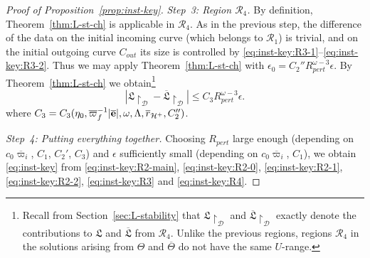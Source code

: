 \documentclass[10pt, reqno]{amsart}
\theoremstyle{definition}
\theoremstyle{remark}
\theoremstyle{conjecture}
\numberwithin{equation}{section}
\newcommand{\abs}[1]{\vert#1\vert}
\newcommand{\0}{\emptyset}
\newcommand{\eps}{\epsilon}
\newcommand{\Lmb}{\Lambda}
\newcommand{\Tht}{\Theta}
\newcommand{\omg}{\omega}
\newcommand{\bfe}{{\bf e}}
\newcommand{\calD}{\mathcal D}
\newcommand{\calH}{\mathcal H}
\newcommand{\calR}{\mathcal R}
\newcommand{\EH}{\calH^{+}}
\newcommand{\pfstep}[1]{\vspace{.5em} {\it \noindent #1.}}
\newcommand{\e}{\bfe}							%
\newcommand{\rbg}{\overline{r}}					%
\newcommand{\varpibg}{\overline{\varpi}}				%
\newcommand{\ebg}{\overline{\e}}					%
\newcommand{\Abs}[1]{\left\vert #1 \right\vert}
\begin{document}
\begin{proof}[Proof of Proposition~\ref{prop:inst-key}]
\pfstep{Step~3: Region $\calR_{4}$}
By definition, Theorem~\ref{thm:L-st-ch} is applicable in $\calR_{4}$. As in the previous step, the difference of the data on the initial incoming curve (which belongs to $\calR_{1}$) is trivial, and on the initial outgoing curve $C_{out}$
its size is controlled by \eqref{eq:inst-key:R3-1}--\eqref{eq:inst-key:R3-2}. Thus we may apply Theorem~\ref{thm:L-st-ch} with $\eps_{0}=C_{2}'' R_{pert}^{\omg-3}  \eps$. By Theorem~\ref{thm:L-st-ch} we obtain\footnote{Recall from Section~\ref{sec:L-stability} that $\mathfrak{L} \restriction_{\calD}$ and $\overline{\mathfrak{L}}\restriction_{\calD}$ exactly denote the contributions to $\mathfrak{L}$ and $\overline{\mathfrak{L}}$ from $\calR_{4}$. Unlike the previous regions, regions $\calR_{4}$ in the solutions arising from $\Tht$ and $\overline{\Tht}$ do not have the same $U$-range.}
\begin{equation} \label{eq:inst-key:R4}
\Abs{\mathfrak{L} \restriction_{\calD}- \overline{\mathfrak{L}}\restriction_{\calD}}
\leq C_{3} R_{pert}^{\omg-3} \eps.
\end{equation}
where $C_{3} = C_{3}(\eta_{0}, \varpibg_{f}^{-1} \abs{\ebg}, \omg, \Lmb, \rbg_{\EH}, C_{2}'')$. 

\pfstep{Step~4: Putting everything together} Choosing $R_{pert}$ large enough (depending on $c_0 \varpibg_{i}$, $C_{1}$, $C_{2}'$, $C_{3}$) and $\eps$ sufficiently small (depending on $c_0 \varpibg_{i}$, $C_{1}$), we obtain \eqref{eq:inst-key} from \eqref{eq:inst-key:R2-main}, \eqref{eq:inst-key:R2-0}, \eqref{eq:inst-key:R2-1}, \eqref{eq:inst-key:R2-2}, \eqref{eq:inst-key:R3} and \eqref{eq:inst-key:R4}. \qedhere
\end{proof}

\clearpage
\appendix
\end{document}
